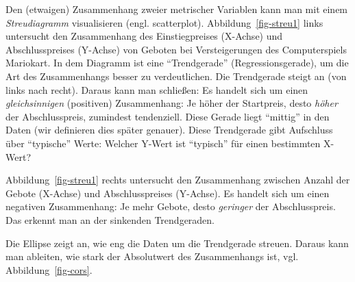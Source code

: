 \documentclass[
  letterpaper,
]{scrbook}
\theoremstyle{definition}
\theoremstyle{definition}
\theoremstyle{definition}
\theoremstyle{remark}
\begin{document}
Den (etwaigen) Zusammenhang zweier metrischer Variablen kann man mit
einem \emph{Streudiagramm} visualisieren (engl. scatterplot).
Abbildung~\ref{fig-streu1} links untersucht den Zusammenhang des
Einstiegpreises (X-Achse) und Abschlusspreises (Y-Achse) von Geboten bei
Versteigerungen des Computerspiels Mariokart. In dem Diagramm ist eine
``Trendgerade'' (Regressionsgerade), um die Art des Zusammenhangs besser
zu verdeutlichen. Die Trendgerade steigt an (von links nach recht).
Daraus kann man schließen: Es handelt sich um einen
\emph{gleichsinnigen} (positiven) Zusammenhang: Je höher der Startpreis,
desto \emph{höher} der Abschlusspreis, zumindest tendenziell. Diese
Gerade liegt ``mittig'' in den Daten (wir definieren dies später
genauer). Diese Trendgerade gibt Aufschluss über ``typische'' Werte:
Welcher Y-Wert ist ``typisch'' für einen bestimmten X-Wert?

Abbildung~\ref{fig-streu1} rechts untersucht den Zusammenhang zwischen
Anzahl der Gebote (X-Achse) und Abschlusspreises (Y-Achse). Es handelt
sich um einen negativen Zusammenhang: Je mehr Gebote, desto
\emph{geringer} der Abschlusspreis. Das erkennt man an der sinkenden
Trendgeraden.

Die Ellipse zeigt an, wie eng die Daten um die Trendgerade streuen.
Daraus kann man ableiten, wie stark der Absolutwert des Zusammenhangs
ist, vgl. Abbildung~\ref{fig-cors}.
\end{document}
